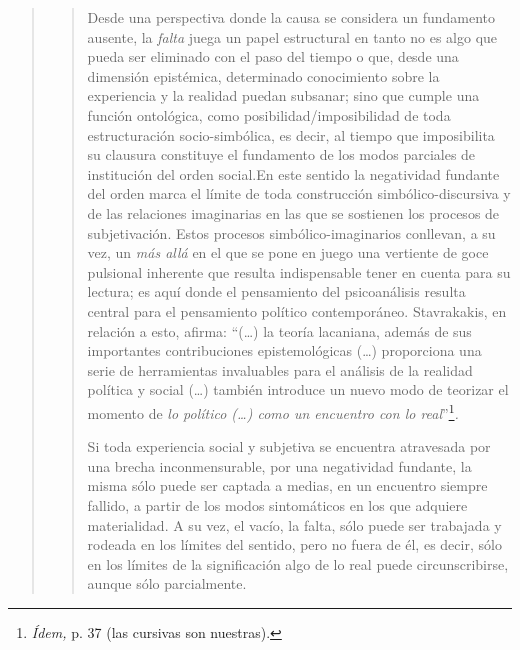 \begin{quote}
\begin{quote}
Desde una perspectiva donde la causa se considera un fundamento ausente, la \emph{falta} juega un papel estructural en tanto no es algo que pueda ser eliminado con el paso del tiempo o que, desde una dimensión epistémica, determinado conocimiento sobre la experiencia y la realidad puedan subsanar; sino que cumple una función ontológica, como posibilidad/imposibilidad de toda estructuración socio-simbólica, es decir, al tiempo que imposibilita su clausura constituye el fundamento de los modos parciales de institución del orden social.En este sentido la negatividad fundante del orden marca el límite de toda construcción simbólico-discursiva y de las relaciones imaginarias en las que se sostienen los procesos de subjetivación. Estos procesos simbólico-imaginarios conllevan, a su vez, un \emph{más allá} en el que se pone en juego una vertiente de goce pulsional inherente que resulta indispensable tener en cuenta para su lectura; es aquí donde el pensamiento del psicoanálisis resulta central para el pensamiento político contemporáneo. Stavrakakis, en relación a esto, afirma: \enquote{(\dots) la teoría lacaniana, además de sus importantes contribuciones epistemológicas (\dots) proporciona una serie de herramientas invaluables para el análisis de la realidad política y social (\dots) también introduce un nuevo modo de teorizar el momento de \emph{lo político (\dots) como un encuentro con lo real}}\footnote{\emph{Ídem,} p. 37 (las cursivas son nuestras).}\emph{.}

Si toda experiencia social y subjetiva se encuentra atravesada por una brecha inconmensurable, por una negatividad fundante, la misma sólo puede ser captada a medias, en un encuentro siempre fallido, a partir de los modos sintomáticos en los que adquiere materialidad. A su vez, el vacío, la falta, sólo puede ser trabajada y rodeada en los límites del sentido, pero no fuera de él, es decir, sólo en los límites de la significación algo de lo real puede circunscribirse, aunque sólo parcialmente.


\end{quote}
\end{quote}
